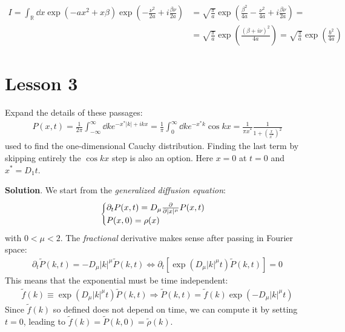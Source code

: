 \documentclass[../template.tex]{subfiles}
\begin{document}
\begin{exo}
    \begin{align*}
        I = \int_{\mathbb{R}} \dd{x} \exp(-ax^2 + x \beta) \exp\left(-\frac{\nu^2}{2a} + i\frac{\beta \nu}{2a}  \right) &= \sqrt{\frac{\pi}{a}} \exp\left(\frac{\beta^2}{4a} - \frac{\nu^2}{4a} + i\frac{\beta \nu}{2a}   \right) =\\
        &= \sqrt{\frac{\pi}{a} } \exp\left(\frac{(\beta + i \nu)^2}{4a}  \right)= \sqrt{\frac{\pi}{a} } \exp\left(\frac{b^2}{4a} \right)
    \end{align*}
\end{exo}

\section{Lesson 3}
\begin{exo}
    Expand the details of these passages:
    \begin{align*}
        P(x, t)=\frac{1}{2 \pi} \int_{-\infty}^{\infty} \dd{k} e^{-x^{*}|k|+i k x}=\frac{1}{\pi} \int_{0}^{\infty} \dd{k} e^{-x^{*} k} \cos k x=\frac{1}{\pi x^{*}} \frac{1}{1+\left(\frac{x}{x^{*}}\right)^{2}}
    \end{align*}
    used to find the one-dimensional Cauchy distribution. Finding the last term by skipping entirely the $\cos kx$ step is also an option. Here $x=0$ at $t=0$ and $x^* = D_1t$.
    \medskip

\textbf{Solution}. We start from the \textit{generalized diffusion equation}:
\begin{align*}
    \begin{cases}
        \partial_t P(x,t) = D_\mu \pdv{|x|^\mu} P(x,t)\\
        P(x,0) = \rho(x)
    \end{cases}
\end{align*} 
with $0 < \mu < 2$. The \textit{fractional} derivative makes sense after passing in Fourier space:
\begin{align*}
    \partial_t \tilde{P}(k,t) = - D_{\mu}|k|^\mu \tilde{P}(k,t) \Leftrightarrow \partial_t[ \exp(D_\mu |k|^\mu t) \tilde{P}(k,t)] = 0
\end{align*} 
This means that the exponential must be time independent:
\begin{align*}
    \tilde{f}(k) \equiv \exp(D_{\mu} |k|^\mu t) \tilde{P}(k,t) \Rightarrow \tilde{P}(k,t) = \tilde{f}(k) \exp(-D_\mu |k|^\mu t)
\end{align*}
Since $\tilde{f}(k)$ so defined does not depend on time, we can compute it by setting $t=0$, leading to $\tilde{f}(k) = \tilde{P}(k,0) = \tilde{\rho}(k)$. 


\end{exo}
\end{document}

